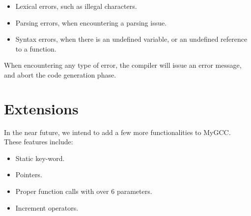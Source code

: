 \documentclass{article}
\begin{document}
\begin{itemize}
\item Lexical errors, such as illegal characters.
\item Parsing errors, when encountering a parsing issue.
\item Syntax errors, when there is an undefined variable, or an undefined reference to a function.
\end{itemize}

When encountering any type of error, the compiler will issue an error message, and abort the code generation phase.

\section{Extensions}
In the near future, we intend to add a few more functionalities to MyGCC.\\
These features include:

\begin{itemize}
\item Static key-word.
\item Pointers.
\item Proper function calls with over 6 parameters.
\item Increment operators.
\end{itemize}
\end{document}
